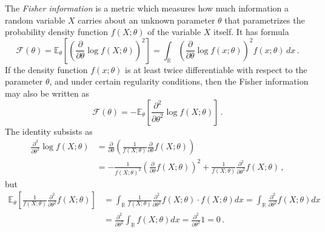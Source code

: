 The \emph{Fisher information} is a metric which measures how much information a random variable $X$ carries about an unknown parameter $\theta$ that parametrizes the probability density function $f(X; \theta)$ of the variable $X$ itself. It has formula
\begin{equation}
    \mathcal F (\theta)
    = \mathbb E_\theta \left[ \left( \frac{\partial}{\partial \theta} \log f(X; \theta) \right)^2 \right]
    = \int_{\mathbb R} \left( \frac{\partial}{\partial \theta} \log f(x; \theta) \right)^2 f(x; \theta) \, dx \, .
    \label{eq:Fisher-information}
\end{equation}
If the density function $f(x; \theta)$ is at least twice differentiable with respect to the parameter $\theta$, and under certain regularity conditions, then the Fisher information may also be written as
\begin{equation}
    \mathcal F(\theta)
    = -\mathbb E_\theta \left[ \frac{\partial^2}{\partial \theta^2} \log f(X; \theta) \right] \, .
\end{equation}
The identity subsists as
\begin{align*}
    \frac{\partial^2}{\partial \theta^2} \log f(X; \theta)
    &= \frac{\partial}{\partial \theta} \left( \frac{1}{f(X; \theta)} \frac{\partial}{\partial \theta} f(X; \theta) \right) \\
    &= - \frac{1}{f(X; \theta)^2} \left( \frac{\partial}{\partial \theta} f(X; \theta) \right)^2 + \frac{1}{f(X; \theta)} \frac{\partial^2}{\partial \theta^2} f(X; \theta) \, ,
\end{align*} 
but
\begin{align*}
    \mathbb E_\theta \left[ \frac{1}{f(X; \theta)} \frac{\partial^2}{\partial \theta^2} f(X; \theta) \right]
    &= \int_{\mathbb R} \frac{1}{f(X; \theta)} \frac{\partial^2}{\partial \theta^2} f(X; \theta) \cdot f(X; \theta) dx
    = \int_{\mathbb R} \frac{\partial^2}{\partial \theta^2} f(X; \theta) dx \\
    &= \frac{\partial^2}{\partial \theta^2} \int_{\mathbb R} f(X; \theta) dx
    = \frac{\partial^2}{\partial\theta^2} 1 = 0 \, .
\end{align*}
